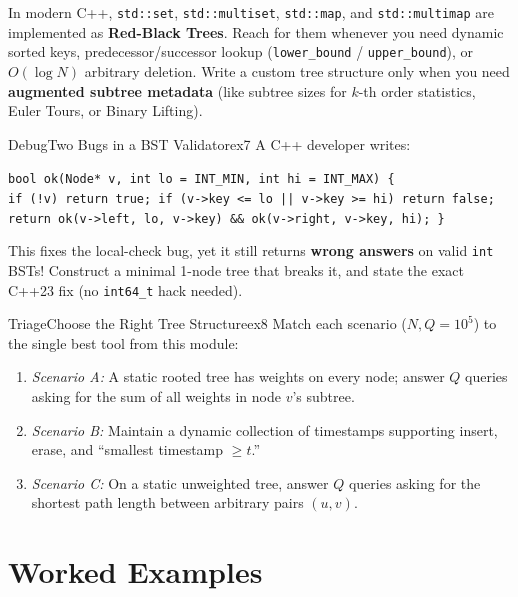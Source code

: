 \documentclass[11pt,a4paper]{article}
\theoremstyle{definition}
\begin{document}
In modern C++, \texttt{std::set}, \texttt{std::multiset}, \texttt{std::map}, and \texttt{std::multimap} are implemented as \textbf{Red-Black Trees}. Reach for them whenever you need dynamic sorted keys, predecessor/successor lookup (\texttt{lower\_bound} / \texttt{upper\_bound}), or $O(\log N)$ arbitrary deletion. Write a custom tree structure only when you need \textbf{augmented subtree metadata} (like subtree sizes for $k$-th order statistics, Euler Tours, or Binary Lifting).

\begin{tryitbox}{Debug}{Two Bugs in a BST Validator}{ex7}
A C++ developer writes:
\begin{center}
\texttt{bool ok(Node* v, int lo = INT\_MIN, int hi = INT\_MAX) \{}\\
\texttt{if (!v) return true; if (v->key <= lo || v->key >= hi) return false;}\\
\texttt{return ok(v->left, lo, v->key) \&\& ok(v->right, v->key, hi); \}}
\end{center}
This fixes the local-check bug, yet it still returns \textbf{wrong answers} on valid \texttt{int} BSTs! Construct a minimal 1-node tree that breaks it, and state the exact C++23 fix (no \texttt{int64\_t} hack needed).
\end{tryitbox}

\begin{tryitbox}{Triage}{Choose the Right Tree Structure}{ex8}
Match each scenario ($N, Q = 10^5$) to the single best tool from this module:
\begin{enumerate}[itemsep=2pt, topsep=2pt]
    \item \emph{Scenario A:} A static rooted tree has weights on every node; answer $Q$ queries asking for the sum of all weights in node $v$'s subtree.
    \item \emph{Scenario B:} Maintain a dynamic collection of timestamps supporting insert, erase, and ``smallest timestamp $\ge t$.''
    \item \emph{Scenario C:} On a static unweighted tree, answer $Q$ queries asking for the shortest path length between arbitrary pairs $(u, v)$.
\end{enumerate}
\end{tryitbox}

\section{Worked Examples}
\label{sec:examples}
\end{document}

